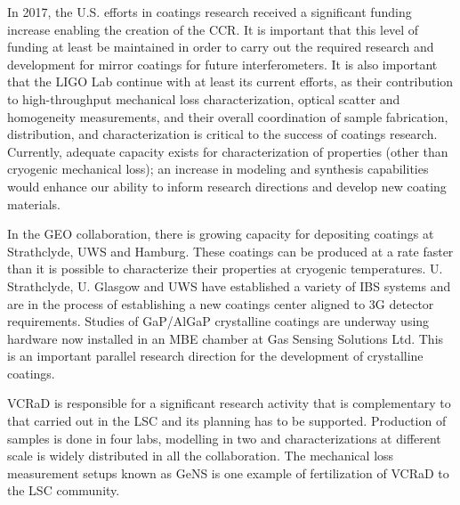 
In 2017, the U.S. efforts in coatings research received a significant funding increase enabling the creation of the \ac{CCR}.  It is important that this level of funding at least be maintained in order to carry out the required research and development for mirror coatings for future interferometers. It is also important that the \ac{LIGO Lab} continue with at least its current efforts, as their contribution to high-throughput mechanical loss characterization, optical scatter and homogeneity measurements, and their overall coordination of sample fabrication, distribution, and characterization is critical to the success of coatings research. Currently, adequate capacity exists for characterization of properties (other than cryogenic mechanical loss); an increase in modeling and synthesis capabilities would enhance our ability to inform research directions and develop new coating materials.

In the \ac{GEO} collaboration, there is growing capacity for depositing coatings at Strathclyde, \ac{UWS} and Hamburg. These coatings can be produced at a rate faster than it is possible to characterize their properties at cryogenic temperatures. U. Strathclyde, U. Glasgow and \ac{UWS} have established a variety of IBS systems and are in the process of establishing a new coatings center aligned to 3G detector requirements. Studies of \ac{GaP/AlGaP} crystalline coatings are underway using hardware now installed in an \ac{MBE} chamber at Gas Sensing Solutions Ltd. This is an important parallel research direction for the development of crystalline coatings.

\ac{VCRaD} is responsible for a significant research activity that is complementary to that carried out in the LSC and its planning has to be supported. Production of samples is done in four labs, modelling in two and characterizations at different scale is widely distributed in all the collaboration. The mechanical loss measurement setups known as \ac{GeNS} is one example of fertilization of \ac{VCRaD} to the \ac{LSC} community. 

